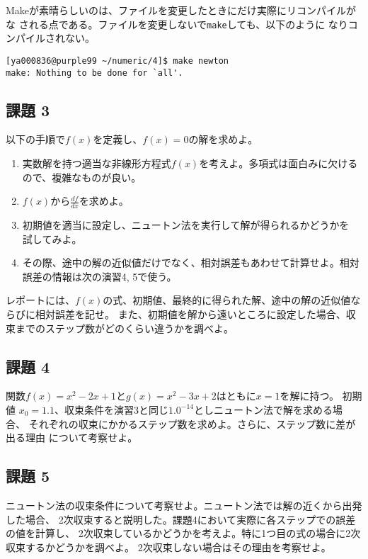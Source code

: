 \documentclass[a4paper]{jsarticle}
\begin{document}
Makeが素晴らしいのは、ファイルを変更したときにだけ実際にリコンパイルがな
される点である。ファイルを変更しないで\texttt{make}しても、以下のように
なりコンパイルされない。
\begin{lstlisting}
[ya000836@purple99 ~/numeric/4]$ make newton
make: Nothing to be done for `all'.
\end{lstlisting}

\subsection*{課題 3}
以下の手順で$f(x)$を定義し、$f(x)=0$の解を求めよ。
\begin{enumerate}
 \item 実数解を持つ適当な非線形方程式$f(x)$を考えよ。多項式は面白みに欠けるので、複雑なものが良い。
 \item $f(x)$から$\displaystyle\frac{df}{dx}$を求めよ。
 \item 初期値を適当に設定し、ニュートン法を実行して解が得られるかどうかを
   試してみよ。
 \item その際、途中の解の近似値だけでなく、相対誤差もあわせて計算せよ。相対誤差の情報は次の演習4, 5で使う。
\end{enumerate}

レポートには、$f(x)$の式、初期値、最終的に得られた解、途中の解の近似値ならびに相対誤差を記せ。
また、初期値を解から遠いところに設定した場合、収束までのステップ数がどのくらい違うかを調べよ。

\subsection*{課題 4}

関数$f(x) = x^{2} - 2x + 1$と$g(x) = x^{2} - 3x + 2$はともに$x = 1$を解に持つ。
初期値 $x_{0} = 1.1$、収束条件を演習3と同じ$1.0^{-14}$としニュートン法で解を求める場合、
それぞれの収束にかかるステップ数を求めよ。さらに、ステップ数に差が出る理由
について考察せよ。

\subsection*{課題 5}

ニュートン法の収束条件について考察せよ。ニュートン法では解の近くから出発した場合、
2次収束すると説明した。課題4において実際に各ステップでの誤差の値を計算し、
2次収束しているかどうかを考えよ。特に1つ目の式の場合に2次収束するかどうかを調べよ。
2次収束しない場合はその理由を考察せよ。
\end{document}
